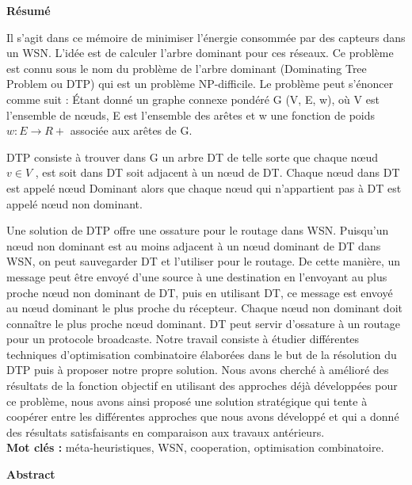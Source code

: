 
\thispagestyle{empty}



\textbf{Résumé}

\small

Il s’agit dans ce mémoire de minimiser l’énergie consommée par des capteurs dans un WSN. L’idée est de calculer l’arbre dominant pour ces réseaux. Ce problème est connu sous le nom du problème de l’arbre dominant (Dominating Tree Problem ou DTP) qui est un problème NP-difficile. Le problème peut s’énoncer comme suit :
Étant donné un graphe connexe pondéré G (V, E, w), où V est l’ensemble de nœuds,  E est l’ensemble des arêtes et w une fonction de poids $w : E \to R+$  associée aux arêtes de G.

DTP consiste à trouver dans G un arbre DT de telle sorte que chaque nœud $v \in V$ , est soit dans DT soit adjacent à un nœud de DT. Chaque nœud dans DT est appelé nœud Dominant alors que chaque nœud qui n’appartient pas à DT est appelé nœud non dominant.

Une solution de DTP offre une ossature pour le routage dans WSN. Puisqu’un nœud non dominant est au moins adjacent à un nœud dominant de DT dans WSN, on peut sauvegarder DT et l’utiliser pour le routage. De cette manière, un message peut être envoyé d’une source à une destination en l’envoyant au plus proche nœud non dominant de DT, puis en utilisant DT, ce message est envoyé au nœud dominant le plus proche du récepteur. Chaque nœud non dominant doit connaître le plus proche nœud dominant. DT peut servir d’ossature à un routage pour un protocole broadcaste. 
Notre travail consiste à étudier différentes techniques d’optimisation combinatoire élaborées dans le but de la résolution du DTP puis à proposer notre propre solution. Nous avons cherché à amélioré des résultats de la fonction objectif en utilisant des approches déjà développées pour ce problème, nous  avons ainsi proposé une solution stratégique qui tente à coopérer entre les différentes approches que nous avons développé  et qui a donné des résultats satisfaisants en comparaison aux travaux antérieurs.\\

\vspace*{0.3cm}
\large
\textbf{Mot clés :} méta-heuristiques, WSN, cooperation, optimisation combinatoire.\\


\vspace*{1.5cm}



\Large
\textbf{Abstract}

